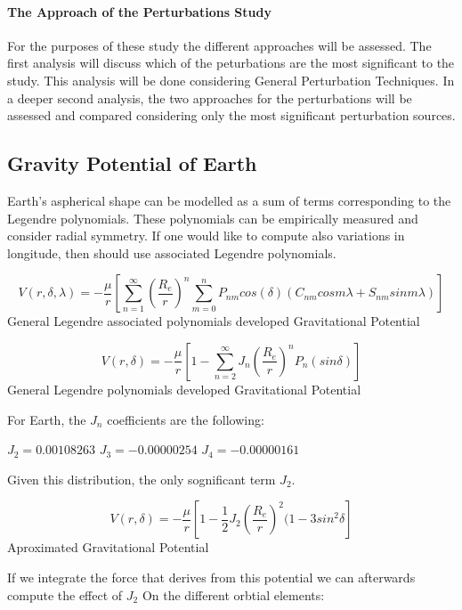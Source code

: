 \paragraph{The Approach of the Perturbations Study}
For the purposes of these study the different approaches will be assessed. The first analysis will discuss which of the peturbations are the most significant to the study. This analysis will be done considering General Perturbation Techniques. In a deeper second analysis, the two approaches for the perturbations will be assessed and compared considering only the most significant perturbation sources.

\subsection{Gravity Potential of Earth}
Earth's aspherical shape can be modelled as a sum of terms corresponding to the Legendre polynomials. These polynomials can be empirically measured and consider radial symmetry. If one would like to compute also variations in longitude, then should use associated Legendre polynomials.

\begin{equation}
V(r,\delta,\lambda) = -\frac{\mu}{r} \left [\sum_{n=1}^{\infty }\left  ( \frac{R_{e}}{r} \right ) ^{n} \sum_{m=0}^{n}P_{nm} cos(\delta )(C_{nm}cos m\lambda + S_{nm}sin m\lambda)  \right ]
\end{equation}
General Legendre associated polynomials developed Gravitational Potential

\begin{equation}
V(r,\delta) = -\frac{\mu}{r} \left [1-\sum_{n=2}^{\infty}   J_{n}\left( \frac{R_{e}}{r}\right) ^{n} P_{n} (sin\delta)  \right ]
\end{equation}
General Legendre polynomials developed Gravitational Potential

For Earth, the $J_{n}$ coefficients are the following:

$J_{2} = 0.00108263$
$J_{3} = -0.00000254$
$J_{4} = -0.00000161$

Given this distribution, the only sognificant term $J_{2}$.

\begin{equation}
V(r,\delta) = -\frac{\mu}{r} \left [1-\frac{1}{2}   J_{2}\left( \frac{R_{e}}{r}\right) ^{2} (1-3sin^2\delta  \right ]
\end{equation}
Aproximated Gravitational Potential

If we integrate the force that derives from this potential we can afterwards compute the effect of $J_{2}$ On the different orbtial elements:

